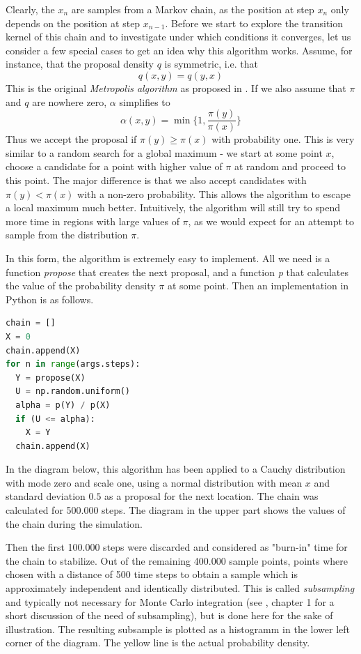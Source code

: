 \documentclass[a4paper, draft]{article}
\theoremstyle{own}
\theoremstyle{remark}
\begin{document}
Clearly, the $x_n$ are samples from a Markov chain, as the position at step $x_n$ only depends on the position at step $x_{n-1}$. Before we start to explore the transition kernel of this chain and to investigate under which conditions it converges, let us consider a few special cases to get an idea why this algorithm works. Assume, for instance, that the proposal density $q$ is symmetric, i.e. that 
$$
q(x,y) = q(y, x)
$$
This is the original {\em Metropolis algorithm} as proposed in \cite{Metropolis1953}. If we also assume that $\pi$ and $q$ are nowhere zero,  $\alpha$ simplifies to
$$
\alpha(x,y) = 
\min \{ 1, \frac{\pi(y)}{\pi(x)} \}
$$
Thus we accept the proposal if $\pi(y) \geq \pi(x)$ with probability one. This is very similar to a random search for a global maximum - we start at some point $x$, choose a candidate for a point with higher value of $\pi$ at random and proceed to this point. The major difference is that we also accept candidates with $\pi(y) < \pi(x)$ with a non-zero probability. This allows the algorithm to escape a local maximum much better. Intuitively, the algorithm will still try to spend more time in regions with large values of $\pi$, as we would expect for an attempt to sample from the distribution $\pi$. 

In this form, the algorithm is extremely easy to implement. All we need is a function {\it propose} that creates the next proposal, and a function {\it p} that calculates the value of the probability density $\pi$ at some point. Then an implementation in Python is as follows.

\begin{lstlisting}[frame=single,language=Python,caption=Metropolis algorithm in Python]
chain = []
X = 0
chain.append(X)
for n in range(args.steps):
  Y = propose(X)
  U = np.random.uniform()
  alpha = p(Y) / p(X)
  if (U <= alpha):
    X = Y
  chain.append(X)
\end{lstlisting}

In the diagram below, this algorithm has been applied to a Cauchy distribution with mode zero
and scale one, using a normal distribution with mean $x$ and standard deviation $0.5$ as a proposal for the next location. The chain was calculated for 500.000 steps. The diagram in the upper part shows the values of the chain during the simulation. 

Then the first 100.000 steps were discarded and considered as "burn-in" time for the chain to stabilize. Out of the remaining 400.000 sample points, points where chosen with a distance of 500 time steps to obtain a sample which is approximately independent and identically distributed.
This is called {\em subsampling} and typically not necessary for Monte Carlo integration (see \cite{MCMCHandbook}, chapter 1 for a short discussion of the need of subsampling), but is done here for the sake of illustration. The resulting subsample is plotted as a histogramm in the lower left corner of the diagram. The yellow line is the actual probability density.  
\end{document}
